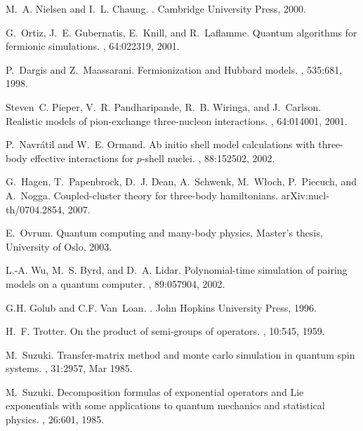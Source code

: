 \documentclass[aps,pra,twocolumn,floatfix]{revtex4}
\begin{document}
\begin{thebibliography}{100}
M.~A. Nielsen and I.~L. Chaung.
.
\newblock Cambridge University Press, 2000.

G.~Ortiz, J.~E. Gubernatis, E.~Knill, and R.~Laflamme.
\newblock Quantum algorithms for fermionic simulations.
, 64:022319, 2001.

P.~Dargis and Z.~Maassarani.
\newblock Fermionization and Hubbard models.
, 535:681, 1998.


Steven~C. Pieper, V.~R. Pandharipande, R.~B. Wiringa, and J.~Carlson.
\newblock Realistic models of pion-exchange three-nucleon interactions.
, 64:014001, 2001.

P.~Navr\'atil and W.~E. Ormand.
\newblock Ab initio shell model calculations with three-body effective
  interactions for $p$-shell nuclei.
, 88:152502, 2002.

G.~Hagen, T.~Papenbrock, D.~J. Dean, A.~Schwenk, M.~W{\l}och, P.~Piecuch, and
  A.~Nogga.
\newblock Coupled-cluster theory for three-body hamiltonians.
\newblock arXiv:nucl-th/0704.2854, 2007.

E.~Ovrum.
\newblock Quantum computing and many-body physics.
\newblock Master's thesis, University of Oslo, 2003.

L.-A. Wu, M.~S. Byrd, and D.~A. Lidar.
\newblock Polynomial-time simulation of pairing models on a quantum computer.
, 89:057904, 2002.

G.H. Golub and C.F. Van~Loan.
.
\newblock John Hopkins University Press, 1996.

H.~F. Trotter.
\newblock On the product of semi-groups of operators.
, 10:545, 1959.

M.~Suzuki.
\newblock Transfer-matrix method and monte carlo simulation in quantum spin
  systems.
, 31:2957, Mar 1985.

M.~Suzuki.
\newblock Decomposition formulas of exponential operators and Lie exponentials
  with some applications to quantum mechanics and statistical physics.
, 26:601, 1985.



\end{thebibliography}
\end{document}
